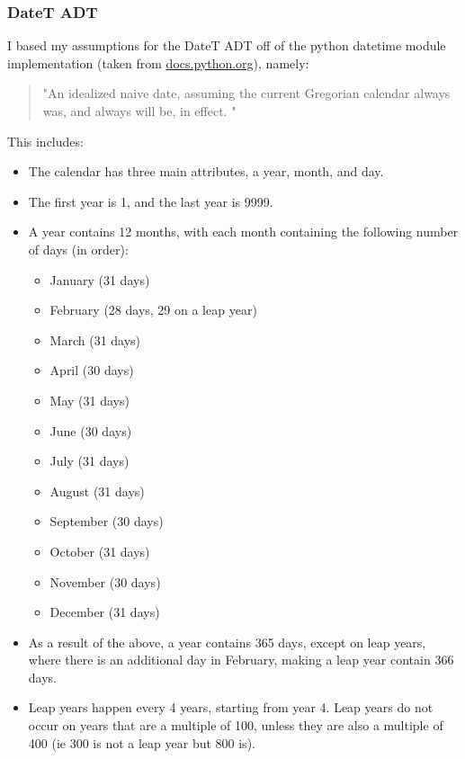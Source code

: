 \documentclass[12pt]{article}
\begin{document}
\subsubsection{DateT ADT}
I based my assumptions for the DateT ADT off of the python datetime module implementation (taken from \url{docs.python.org}), namely:
\begin{quotation}
  "An idealized naive date, assuming the current Gregorian calendar always was, and always will be, in effect. "
\end{quotation}
This includes:
\begin{itemize}
  \item The calendar has three main attributes, a year, month, and day.
  \item The first year is 1, and the last year is 9999.
  \item A year contains 12 months, with each month containing the following number of days (in order):
  \begin{itemize}
      \item January (31 days)
      \item February (28 days, 29 on a leap year)
      \item March (31 days)
      \item April (30 days)
      \item May (31 days)
      \item June (30 days)
      \item July (31 days)
      \item August (31 days)
      \item September (30 days)
      \item October (31 days)
      \item November (30 days)
      \item December (31 days)
  \end{itemize}
  \item As a result of the above, a year contains 365 days, except on leap years, where there is an additional day in February, making a leap year contain 366 days.
  \item Leap years happen every 4 years, starting from year 4. Leap years do not occur on years that are a multiple of 100, unless they are also a multiple of 400 (ie 300 is not a leap year but 800 is).
\end{itemize}
\end{document}
